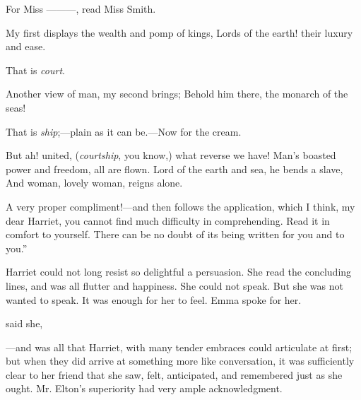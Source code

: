 For Miss ---------, read Miss Smith.

My first displays the wealth and pomp of kings,\crlf
Lords of the earth! their luxury and ease.

That is {\em court}.

Another view of man, my second brings;\crlf
Behold him there, the monarch of the seas!

That is {\em ship};---plain as it can be.---Now for the cream.

But ah! united, ({\em courtship}, you know,) what reverse we have!\crlf
Man's boasted power and freedom, all are flown.\crlf
Lord of the earth and sea, he bends a slave,\crlf
And woman, lovely woman, reigns alone.

A very proper compliment!---and then follows the application, which I think, my dear Harriet, you cannot find much difficulty in comprehending. Read it in comfort to yourself. There can be no doubt of its being written for you and to you.”

Harriet could not long resist so delightful a persuasion. She read the concluding lines, and was all flutter and happiness. She could not speak. But she was not wanted to speak. It was enough for her to feel. Emma spoke for her.

 said she, 

---and  was all that Harriet, with many tender embraces could articulate at first; but when they did arrive at something more like conversation, it was sufficiently clear to her friend that she saw, felt, anticipated, and remembered just as she ought. Mr. Elton's superiority had very ample acknowledgment.

